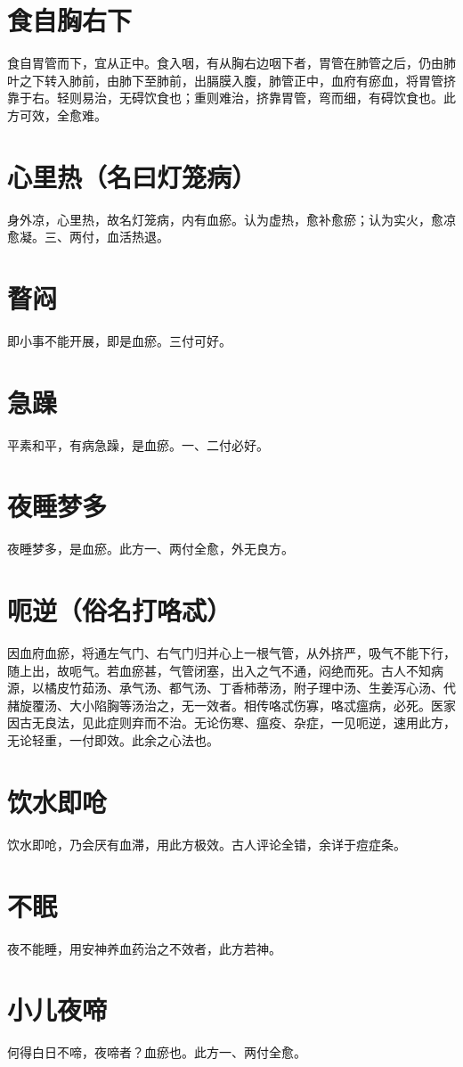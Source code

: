 \documentclass[a4paper,12pt,UTF8,twoside]{ctexbook}
\begin{document}
	\section{食自胸右下}
	食自胃管而下，宜从正中。食入咽，有从胸右边咽下者，胃管在肺管之后，仍由肺叶之下转入肺前，由肺下至肺前，出膈膜入腹，肺管正中，血府有瘀血，将胃管挤靠于右。轻则易治，无碍饮食也；重则难治，挤靠胃管，弯而细，有碍饮食也。此方可效，全愈难。
	\section{心里热（名曰灯笼病）}
	身外凉，心里热，故名灯笼病，内有血瘀。认为虚热，愈补愈瘀；认为实火，愈凉愈凝。三、两付，血活热退。
	\section{瞀闷}
	即小事不能开展，即是血瘀。三付可好。
	\section{急躁}
	平素和平，有病急躁，是血瘀。一、二付必好。
	\section{夜睡梦多}
	夜睡梦多，是血瘀。此方一、两付全愈，外无良方。
	\section{呃逆（俗名打咯忒）}
	因血府血瘀，将通左气门、右气门归并心上一根气管，从外挤严，吸气不能下行，随上出，故呃气。若血瘀甚，气管闭塞，出入之气不通，闷绝而死。古人不知病源，以橘皮竹茹汤、承气汤、都气汤、丁香柿蒂汤，附子理中汤、生姜泻心汤、代赭旋覆汤、大小陷胸等汤治之，无一效者。相传咯忒伤寡，咯忒瘟病，必死。医家因古无良法，见此症则弃而不治。无论伤寒、瘟疫、杂症，一见呃逆，速用此方，无论轻重，一付即效。此余之心法也。
	\section{饮水即呛}
	饮水即呛，乃会厌有血滞，用此方极效。古人评论全错，余详于痘症条。
	\section{不眠}
	夜不能睡，用安神养血药治之不效者，此方若神。
	\section{小儿夜啼}
	何得白日不啼，夜啼者？血瘀也。此方一、两付全愈。
\end{document}
